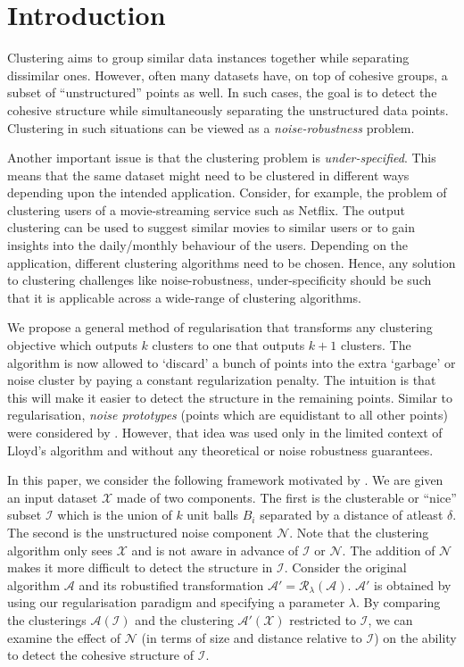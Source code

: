 \documentclass[12pt]{article}
\newcommand{\mc}{\mathcal}
\begin{document}
\fi

\section{Introduction}
Clustering aims to group similar data instances together while separating dissimilar ones. However, often many datasets have, on top of cohesive groups, a subset of ``unstructured'' points as well. In such cases, the goal is to detect the cohesive structure while simultaneously separating the unstructured data points. Clustering in such situations can be viewed as a {\em noise-robustness} problem. 

Another important issue is that the clustering problem is {\em under-specified}. This means that the same dataset might need to be clustered in different ways depending upon the intended application. Consider, for example, the problem of clustering users of a movie-streaming service such as Netflix. The output clustering can be used to suggest similar movies to similar users or to gain insights into the daily/monthly behaviour of the users. Depending on the application, different clustering algorithms need to be chosen. Hence, any solution to clustering challenges like noise-robustness, under-specificity should be such that it is applicable across a wide-range of clustering algorithms. 

We propose a general method of regularisation that transforms any clustering objective which outputs $k$ clusters to one that outputs $k+1$ clusters. The algorithm is now allowed to `discard' a bunch of points into the extra `garbage' or noise cluster by paying a constant regularization penalty. The intuition is that this will make it easier to detect the structure in the remaining points. Similar to regularisation, {\em noise prototypes} (points which are equidistant to all other points) were considered by \cite{dave1993robust}. However, that idea was used only in the limited context of Lloyd’s algorithm and without any theoretical or noise robustness guarantees.

In this paper, we consider the following framework motivated by \cite{ben2014clustering}. We are given an input dataset $\mc X$ made of two components. The first is the clusterable or ``nice'' subset $\mc I$ which is the union of $k$ unit balls $B_i$ separated by a distance of atleast $\delta$. The second is the unstructured noise component $\mc N$. Note that the clustering algorithm only sees $\mc X$ and is not aware in advance of $\mc I$ or $\mc N$. The addition of $\mc N$ makes it more difficult to detect the structure in $\mc I$. Consider the original algorithm $\mc A$ and its robustified transformation $\mc A' = \mc R_{\lambda}(\mc A)$. $\mc A'$ is obtained by using our regularisation paradigm and specifying a parameter $\lambda$. By comparing the clusterings $\mc A(\mc I)$ and the clustering $\mc A'(\mc X)$ restricted to $\mc I$, we can examine the effect of $\mc N$ (in terms of size and distance relative to $\mc I$) on the ability to detect the cohesive structure of $\mc I$.
\end{document}
